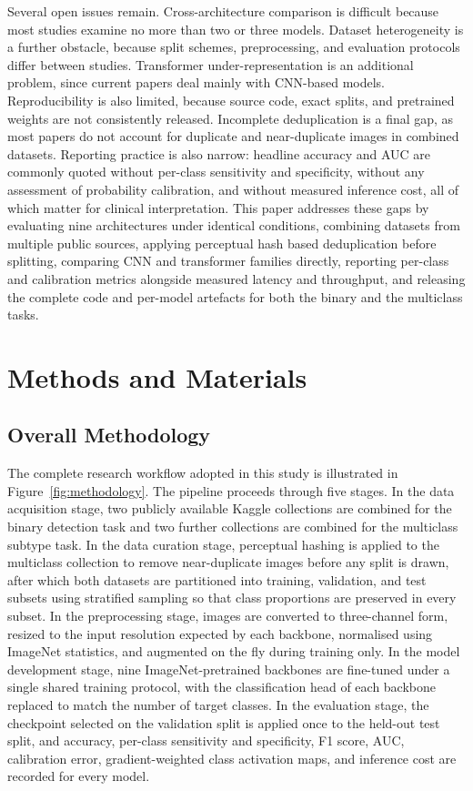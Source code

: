 \documentclass[final,3p,times,number]{elsarticle}
\begin{document}
Several open issues remain. Cross-architecture comparison is difficult because most studies examine no more than two or three models. Dataset heterogeneity is a further obstacle, because split schemes, preprocessing, and evaluation protocols differ between studies. Transformer under-representation is an additional problem, since current papers deal mainly with CNN-based models. Reproducibility is also limited, because source code, exact splits, and pretrained weights are not consistently released. Incomplete deduplication is a final gap, as most papers do not account for duplicate and near-duplicate images in combined datasets. Reporting practice is also narrow: headline accuracy and AUC are commonly quoted without per-class sensitivity and specificity, without any assessment of probability calibration, and without measured inference cost, all of which matter for clinical interpretation. This paper addresses these gaps by evaluating nine architectures under identical conditions, combining datasets from multiple public sources, applying perceptual hash based deduplication before splitting, comparing CNN and transformer families directly, reporting per-class and calibration metrics alongside measured latency and throughput, and releasing the complete code and per-model artefacts for both the binary and the multiclass tasks.

\section{Methods and Materials}
\label{sec:methods}

\subsection{Overall Methodology}
\label{sec:workflow}

The complete research workflow adopted in this study is illustrated in Figure~\ref{fig:methodology}. The pipeline proceeds through five stages. In the data acquisition stage, two publicly available Kaggle collections are combined for the binary detection task and two further collections are combined for the multiclass subtype task. In the data curation stage, perceptual hashing is applied to the multiclass collection to remove near-duplicate images before any split is drawn, after which both datasets are partitioned into training, validation, and test subsets using stratified sampling so that class proportions are preserved in every subset. In the preprocessing stage, images are converted to three-channel form, resized to the input resolution expected by each backbone, normalised using ImageNet statistics, and augmented on the fly during training only. In the model development stage, nine ImageNet-pretrained backbones are fine-tuned under a single shared training protocol, with the classification head of each backbone replaced to match the number of target classes. In the evaluation stage, the checkpoint selected on the validation split is applied once to the held-out test split, and accuracy, per-class sensitivity and specificity, F1 score, AUC, calibration error, gradient-weighted class activation maps, and inference cost are recorded for every model.
\end{document}
